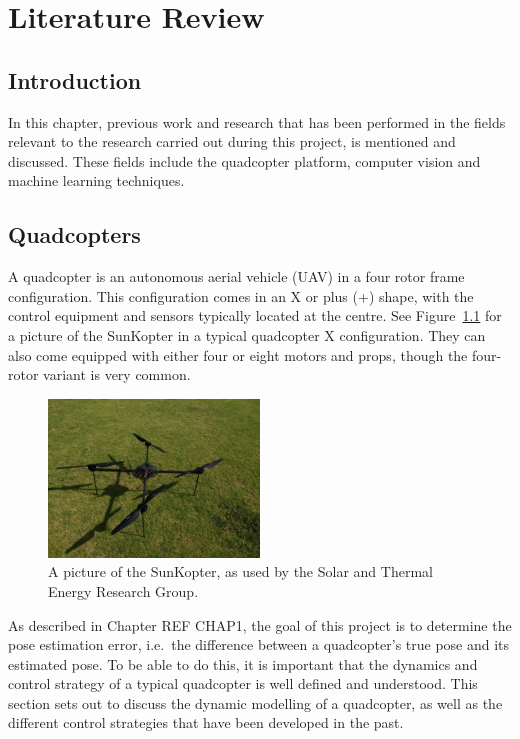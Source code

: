 \chapter{Literature Review}
\label{chap:lit-review}

\section{Introduction}

In this chapter, previous work and research that has been performed in the fields relevant to the research carried out during this project, is mentioned and discussed. These fields include the quadcopter platform, computer vision and machine learning techniques. 

\section{Quadcopters}

A quadcopter is an autonomous aerial vehicle (UAV) in a four rotor frame configuration. This configuration comes in an X or plus (+) shape, with the control equipment and sensors typically located at the centre. See Figure~\ref{fig:chap2-quad} for a picture of the SunKopter in a typical quadcopter X configuration. They can also come equipped with either four or eight motors and props, though the four-rotor variant is very common.

\begin{figure}
  \centering
  \includegraphics[clip, trim = 0 0 30 20, width=0.5\textwidth]{figures/chapter2/quadcopter}
  \caption[A picture of the SunKopter, as used by STERG.]{A picture of the SunKopter, as used by the Solar and Thermal Energy Research Group.}
\label{fig:chap2-quad}
\end{figure}

As described in Chapter REF CHAP1, the goal of this project is to determine the pose estimation error, i.e.\ the difference between a quadcopter's true pose and its estimated pose. To be able to do this, it is important that the dynamics and control strategy of a typical quadcopter is well defined and understood. This section sets out to discuss the dynamic modelling of a quadcopter, as well as the different control strategies that have been developed in the past. 

